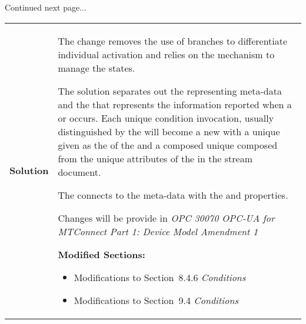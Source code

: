 Continued next page...

\begin{table}[ht]
  \centering 
  \tabulinesep=6pt
  \begin{tabu} to 6in {|l|X|} \everyrow{\hline}
    \hline
    \bfseries {Solution} &
    {
      The change removes the use of branches to differentiate individual  activation and relies on the   mechanism to manage the  states.
      \vspace{6pt}
      
      The solution separates out the  representing meta-data and the  that represents the information reported when a  or  occurs. Each unique condition invocation, usually distinguished by the  will become a new  with a unique  given as the  of the  and a composed unique  composed from the unique attributes of the  in the stream document.

      \vspace{6pt}
      The  connects to the  meta-data  with the  and  properties.

      Changes will be provide in \textit{OPC 30070 OPC-UA for MTConnect Part 1: Device Model Amendment 1}
      
      \vspace{12pt}
      \textbf{Modified Sections:}
      \begin{itemize}
        \item Modifications to Section~8.4.6 \textit{Conditions}
        \item Modifications to Section~9.4 \textit{Conditions}
      \end{itemize}
    }\\
  \end{tabu}
\end{table}


\FloatBarrier

